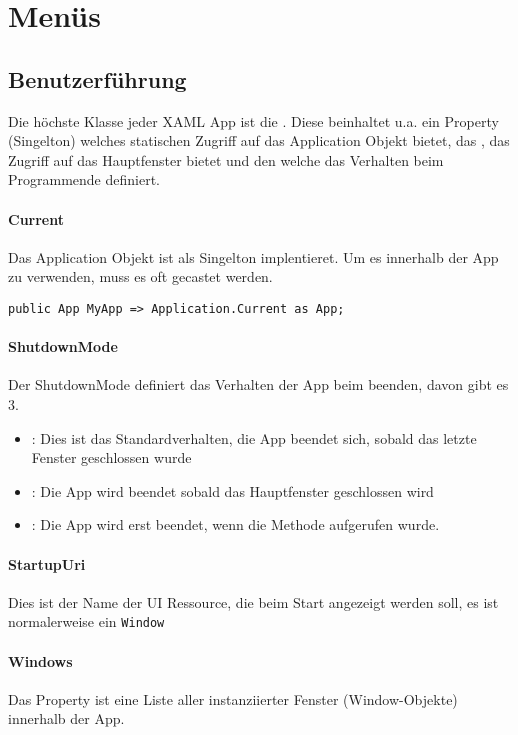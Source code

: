 \section{Menüs}
\subsection{Benutzerführung}
Die höchste Klasse jeder XAML App ist die . Diese beinhaltet u.a. ein  Property (Singelton) welches statischen Zugriff auf das Application Objekt bietet, das , das Zugriff auf das Hauptfenster bietet und den  welche das Verhalten beim Programmende definiert.
\paragraph{Current} Das Application Objekt ist als Singelton implentieret. Um es innerhalb der App zu verwenden, muss es oft gecastet werden.
\begin{lstlisting}
public App MyApp => Application.Current as App;
\end{lstlisting}
\paragraph{ShutdownMode} Der ShutdownMode definiert das Verhalten der App beim beenden, davon gibt es 3.
\begin{itemize}
\item {}: Dies ist das Standardverhalten, die App beendet sich, sobald das letzte Fenster geschlossen wurde
\item {}: Die App wird beendet sobald das Hauptfenster geschlossen wird
\item {}: Die App wird erst beendet, wenn die  Methode aufgerufen wurde.
\end{itemize}
\paragraph{StartupUri} Dies ist der Name der UI Ressource, die beim Start angezeigt werden soll, es ist normalerweise ein \verb+Window+
\paragraph{Windows} Das  Property ist eine Liste aller instanziierter Fenster (Window-Objekte) innerhalb der App.
